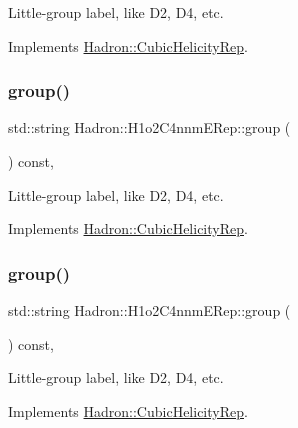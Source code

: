 Little-\/group label, like D2, D4, etc. 

Implements \mbox{\hyperlink{structHadron_1_1CubicHelicityRep_a101a7d76cd8ccdad0f272db44b766113}{Hadron\+::\+Cubic\+Helicity\+Rep}}.

\mbox{\label{structHadron_1_1H1o2C4nnmERep_a23b4794a3121b2c1d2fdbb09b4191816}} 
\subsubsection{\texorpdfstring{group()}{group()}\hspace{0.1cm}{\footnotesize\ttfamily [2/3]}}
{\footnotesize\ttfamily std\+::string Hadron\+::\+H1o2\+C4nnm\+E\+Rep\+::group (\begin{DoxyParamCaption}{ }\end{DoxyParamCaption}) const\hspace{0.3cm}{\ttfamily [inline]}, {\ttfamily [virtual]}}

Little-\/group label, like D2, D4, etc. 

Implements \mbox{\hyperlink{structHadron_1_1CubicHelicityRep_a101a7d76cd8ccdad0f272db44b766113}{Hadron\+::\+Cubic\+Helicity\+Rep}}.

\mbox{\label{structHadron_1_1H1o2C4nnmERep_a23b4794a3121b2c1d2fdbb09b4191816}} 
\subsubsection{\texorpdfstring{group()}{group()}\hspace{0.1cm}{\footnotesize\ttfamily [3/3]}}
{\footnotesize\ttfamily std\+::string Hadron\+::\+H1o2\+C4nnm\+E\+Rep\+::group (\begin{DoxyParamCaption}{ }\end{DoxyParamCaption}) const\hspace{0.3cm}{\ttfamily [inline]}, {\ttfamily [virtual]}}

Little-\/group label, like D2, D4, etc. 

Implements \mbox{\hyperlink{structHadron_1_1CubicHelicityRep_a101a7d76cd8ccdad0f272db44b766113}{Hadron\+::\+Cubic\+Helicity\+Rep}}.

